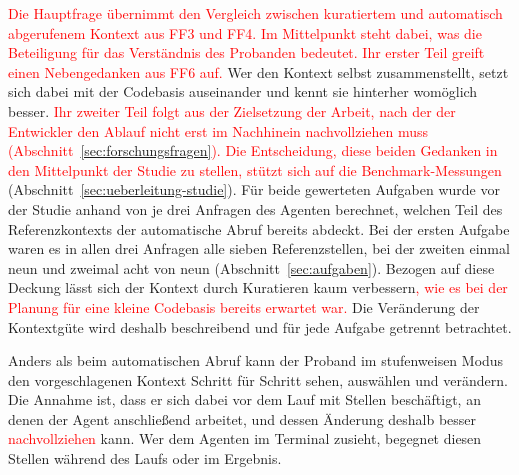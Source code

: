 \textcolor{red}{Die Hauptfrage übernimmt den Vergleich zwischen kuratiertem und automatisch abgerufenem Kontext aus FF3 und FF4. Im Mittelpunkt steht dabei, was die Beteiligung für das Verständnis des Probanden bedeutet. Ihr erster Teil greift einen Nebengedanken aus FF6 auf.} Wer den Kontext selbst zusammenstellt, setzt sich dabei mit der Codebasis auseinander und kennt sie hinterher womöglich besser. \textcolor{red}{Ihr zweiter Teil folgt aus der Zielsetzung der Arbeit, nach der der Entwickler den Ablauf nicht erst im Nachhinein nachvollziehen muss (Abschnitt~\ref{sec:forschungsfragen}). Die Entscheidung, diese beiden Gedanken in den Mittelpunkt der Studie zu stellen, stützt sich auf die Benchmark-Messungen} (Abschnitt~\ref{sec:ueberleitung-studie}). Für beide gewerteten Aufgaben wurde vor der Studie anhand von je drei Anfragen des Agenten berechnet, welchen Teil des Referenzkontexts der automatische Abruf bereits abdeckt. Bei der ersten Aufgabe waren es in allen drei Anfragen alle sieben Referenzstellen, bei der zweiten einmal neun und zweimal acht von neun (Abschnitt~\ref{sec:aufgaben}). Bezogen auf diese Deckung lässt sich der Kontext durch Kuratieren kaum verbessern\textcolor{red}{, wie es bei der Planung für eine kleine Codebasis bereits erwartet war.} Die Veränderung der Kontextgüte wird deshalb beschreibend und für jede Aufgabe getrennt betrachtet.

Anders als beim automatischen Abruf kann der Proband im stufenweisen Modus den vorgeschlagenen Kontext Schritt für Schritt sehen, auswählen und verändern. Die Annahme ist, dass er sich dabei vor dem Lauf mit Stellen beschäftigt, an denen der Agent anschließend arbeitet, und dessen Änderung deshalb besser \textcolor{red}{nachvollziehen} kann. Wer dem Agenten im Terminal zusieht, begegnet diesen Stellen während des Laufs oder im Ergebnis.

